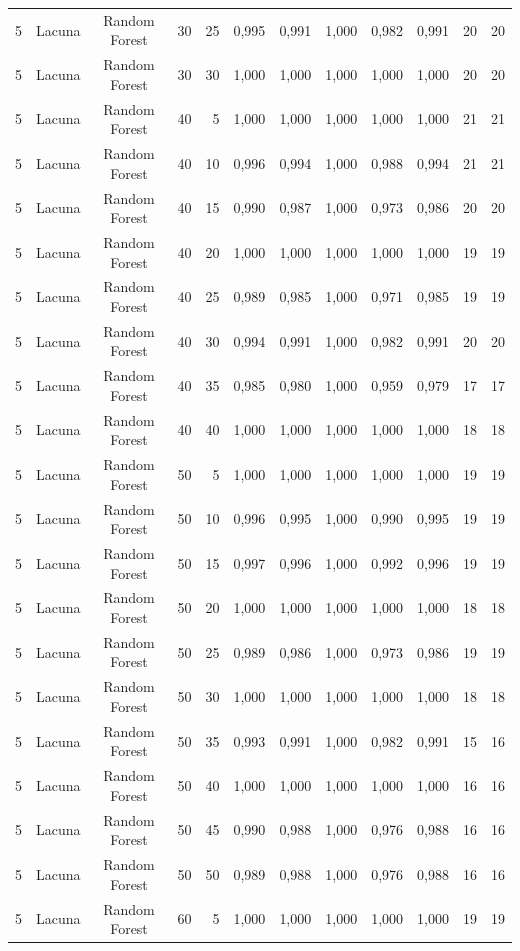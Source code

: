 \begin{longtable}{ccclrrrrrrrr}
5 & Lacuna & Random Forest & 30 & 25 & 0,995 & 0,991 & 1,000 & 0,982 & 0,991 & 20 & 20 \\
5 & Lacuna & Random Forest & 30 & 30 & 1,000 & 1,000 & 1,000 & 1,000 & 1,000 & 20 & 20 \\
5 & Lacuna & Random Forest & 40 & 5 & 1,000 & 1,000 & 1,000 & 1,000 & 1,000 & 21 & 21 \\
5 & Lacuna & Random Forest & 40 & 10 & 0,996 & 0,994 & 1,000 & 0,988 & 0,994 & 21 & 21 \\
5 & Lacuna & Random Forest & 40 & 15 & 0,990 & 0,987 & 1,000 & 0,973 & 0,986 & 20 & 20 \\
5 & Lacuna & Random Forest & 40 & 20 & 1,000 & 1,000 & 1,000 & 1,000 & 1,000 & 19 & 19 \\
5 & Lacuna & Random Forest & 40 & 25 & 0,989 & 0,985 & 1,000 & 0,971 & 0,985 & 19 & 19 \\
5 & Lacuna & Random Forest & 40 & 30 & 0,994 & 0,991 & 1,000 & 0,982 & 0,991 & 20 & 20 \\
5 & Lacuna & Random Forest & 40 & 35 & 0,985 & 0,980 & 1,000 & 0,959 & 0,979 & 17 & 17 \\
5 & Lacuna & Random Forest & 40 & 40 & 1,000 & 1,000 & 1,000 & 1,000 & 1,000 & 18 & 18 \\
5 & Lacuna & Random Forest & 50 & 5 & 1,000 & 1,000 & 1,000 & 1,000 & 1,000 & 19 & 19 \\
5 & Lacuna & Random Forest & 50 & 10 & 0,996 & 0,995 & 1,000 & 0,990 & 0,995 & 19 & 19 \\
5 & Lacuna & Random Forest & 50 & 15 & 0,997 & 0,996 & 1,000 & 0,992 & 0,996 & 19 & 19 \\
5 & Lacuna & Random Forest & 50 & 20 & 1,000 & 1,000 & 1,000 & 1,000 & 1,000 & 18 & 18 \\
5 & Lacuna & Random Forest & 50 & 25 & 0,989 & 0,986 & 1,000 & 0,973 & 0,986 & 19 & 19 \\
5 & Lacuna & Random Forest & 50 & 30 & 1,000 & 1,000 & 1,000 & 1,000 & 1,000 & 18 & 18 \\
5 & Lacuna & Random Forest & 50 & 35 & 0,993 & 0,991 & 1,000 & 0,982 & 0,991 & 15 & 16 \\
5 & Lacuna & Random Forest & 50 & 40 & 1,000 & 1,000 & 1,000 & 1,000 & 1,000 & 16 & 16 \\
5 & Lacuna & Random Forest & 50 & 45 & 0,990 & 0,988 & 1,000 & 0,976 & 0,988 & 16 & 16 \\
5 & Lacuna & Random Forest & 50 & 50 & 0,989 & 0,988 & 1,000 & 0,976 & 0,988 & 16 & 16 \\
5 & Lacuna & Random Forest & 60 & 5 & 1,000 & 1,000 & 1,000 & 1,000 & 1,000 & 19 & 19 \\

\end{longtable}
